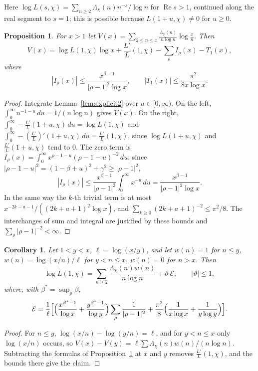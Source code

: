 \documentclass[11pt]{amsart}
\newtheorem{proposition}[theorem]{Proposition}
\newtheorem{corollary}[theorem]{Corollary}
\theoremstyle{definition}
\theoremstyle{remark}
\numberwithin{equation}{section}
\renewcommand{\Re}{\operatorname{Re}}
\newcommand{\Lam}{\Lambda_\chi}
\begin{document}
Here $\log L(s,\chi)=\sum_{n\ge2}\Lam(n)n^{-s}/\log n$ for $\Re s>1$, continued along the real segment to $s=1$; this is possible because $L(1+u,\chi)\neq0$ for $u\ge0$.

\begin{proposition}\label{prop:integrated}
For $x>1$ let $V(x)=\sum_{2\le n\le x}\frac{\Lam(n)}{n\log n}\log\frac xn$. Then
\[
V(x)=\log L(1,\chi)\log x+\frac{L'}{L}(1,\chi)-\sum_\rho I_\rho(x)-T_1(x),
\]
where
\[
|I_\rho(x)|\le\frac{x^{\beta-1}}{|\rho-1|^2\log x},\qquad|T_1(x)|\le\frac{\pi^2}{8x\log x}.
\]
\end{proposition}

\begin{proof}
Integrate Lemma~\ref{lem:explicit2} over $u\in[0,\infty)$. On the left, $\int_0^\infty n^{-1-u}\,du=1/(n\log n)$ gives $V(x)$. On the right, $\int_0^\infty-\frac{L'}{L}(1+u,\chi)\,du=\log L(1,\chi)$ and $\int_0^\infty-(\frac{L'}{L})'(1+u,\chi)\,du=\frac{L'}{L}(1,\chi)$, since $\log L(1+u,\chi)$ and $\frac{L'}{L}(1+u,\chi)$ tend to $0$. The zero term is $I_\rho(x)=\int_0^\infty x^{\rho-1-u}(\rho-1-u)^{-2}\,du$; since $|\rho-1-u|^2=(1-\beta+u)^2+\gamma^2\ge|\rho-1|^2$,
\[
|I_\rho(x)|\le\frac{x^{\beta-1}}{|\rho-1|^2}\int_0^\infty x^{-u}\,du=\frac{x^{\beta-1}}{|\rho-1|^2\log x}.
\]
In the same way the $k$-th trivial term is at most $x^{-2k-a-1}/((2k+a+1)^2\log x)$, and $\sum_{k\ge0}(2k+a+1)^{-2}\le\pi^2/8$. The interchanges of sum and integral are justified by these bounds and $\sum_\rho|\rho-1|^{-2}<\infty$.
\end{proof}

\begin{corollary}\label{cor:difference}
Let $1<y<x$, $\ell=\log(x/y)$, and let $w(n)=1$ for $n\le y$, $w(n)=\log(x/n)/\ell$ for $y<n\le x$, $w(n)=0$ for $n>x$. Then
\[
\log L(1,\chi)=\sum_{n\ge2}\frac{\Lam(n)w(n)}{n\log n}+\vartheta\,\mathcal E,\qquad|\vartheta|\le1,
\]
where, with $\beta^*=\sup_\rho\beta$,
\[
\mathcal E=\frac1\ell\Bigl[\Bigl(\frac{x^{\beta^*-1}}{\log x}+\frac{y^{\beta^*-1}}{\log y}\Bigr)\sum_\rho\frac1{|\rho-1|^2}+\frac{\pi^2}{8}\Bigl(\frac1{x\log x}+\frac1{y\log y}\Bigr)\Bigr].
\]
\end{corollary}

\begin{proof}
For $n\le y$, $\log(x/n)-\log(y/n)=\ell$, and for $y<n\le x$ only $\log(x/n)$ occurs, so $V(x)-V(y)=\ell\sum\Lam(n)w(n)/(n\log n)$. Subtracting the formulas of Proposition~\ref{prop:integrated} at $x$ and $y$ removes $\frac{L'}{L}(1,\chi)$, and the bounds there give the claim.
\end{proof}
\end{document}
